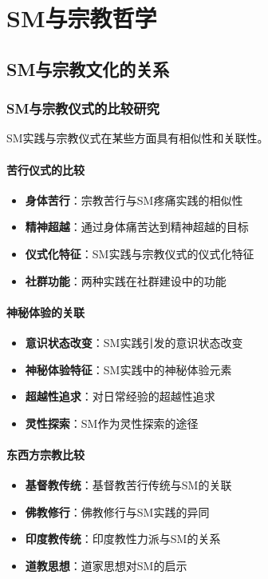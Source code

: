 \documentclass[12pt,UTF8]{ctexbook}
\begin{document}
\part{SM与宗教哲学}

\chapter{SM与宗教文化的关系}
\section{SM与宗教仪式的比较研究}
SM实践与宗教仪式在某些方面具有相似性和关联性。

\subsection{苦行仪式的比较}
\begin{itemize}[leftmargin=2cm]
	\item \textbf{身体苦行}：宗教苦行与SM疼痛实践的相似性
	\item \textbf{精神超越}：通过身体痛苦达到精神超越的目标
	\item \textbf{仪式化特征}：SM实践与宗教仪式的仪式化特征
	\item \textbf{社群功能}：两种实践在社群建设中的功能
\end{itemize}

\subsection{神秘体验的关联}
\begin{itemize}[leftmargin=2cm]
	\item \textbf{意识状态改变}：SM实践引发的意识状态改变
	\item \textbf{神秘体验特征}：SM实践中的神秘体验元素
	\item \textbf{超越性追求}：对日常经验的超越性追求
	\item \textbf{灵性探索}：SM作为灵性探索的途径
\end{itemize}

\subsection{东西方宗教比较}
\begin{itemize}[leftmargin=2cm]
	\item \textbf{基督教传统}：基督教苦行传统与SM的关联
	\item \textbf{佛教修行}：佛教修行与SM实践的异同
	\item \textbf{印度教传统}：印度教性力派与SM的关系
	\item \textbf{道教思想}：道家思想对SM的启示
\end{itemize}
\end{document}

